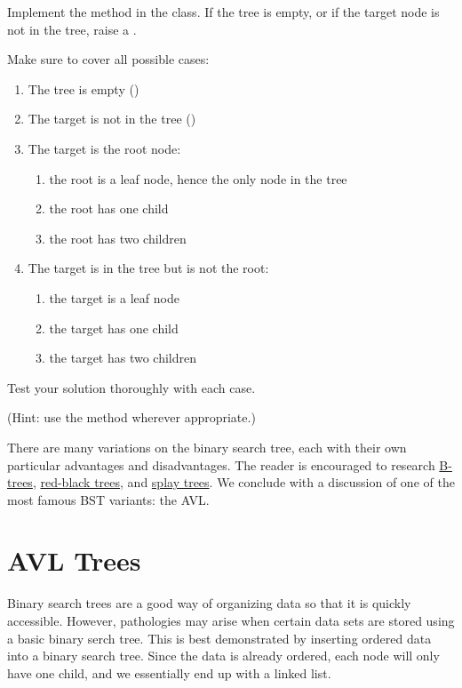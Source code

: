 \begin{problem}
Implement the  method in the  class.
If the tree is empty, or if the target node is not in the tree, raise a .

Make sure to cover all possible cases:
\begin{enumerate}
\item The tree is empty ()
\item The target is not in the tree ()
\item The target is the root node:
	\begin{enumerate}
	\item{the root is a leaf node, hence the only node in the tree}
	\item{the root has one child}
	\item{the root has two children}
	\end{enumerate}
\item The target is in the tree but is not the root:
	\begin{enumerate}
	\item{the target is a leaf node}
	\item{the target has one child}
	\item{the target has two children}
	\end{enumerate}
\end{enumerate}
Test your solution thoroughly with each case.

(Hint: use the  method wherever appropriate.)
\end{problem}

There are many variations on the binary search tree, each with their own particular advantages and disadvantages.
The reader is encouraged to research \href{https://en.wikipedia.org/wiki/B-tree}{B-trees}, \href{https://en.wikipedia.org/wiki/Red%E2%80%93black_tree}{red-black trees}, and \href{https://en.wikipedia.org/wiki/Splay_tree}{splay trees}.
We conclude with a discussion of one of the most famous BST variants: the AVL.

\section*{AVL Trees}

Binary search trees are a good way of organizing data so that it is quickly accessible.
However, pathologies may arise when certain data sets are stored using a basic binary serch tree.
This is best demonstrated by inserting ordered data into a binary search tree.
Since the data is already ordered, each node will only have one child, and we essentially end up with a linked list.

